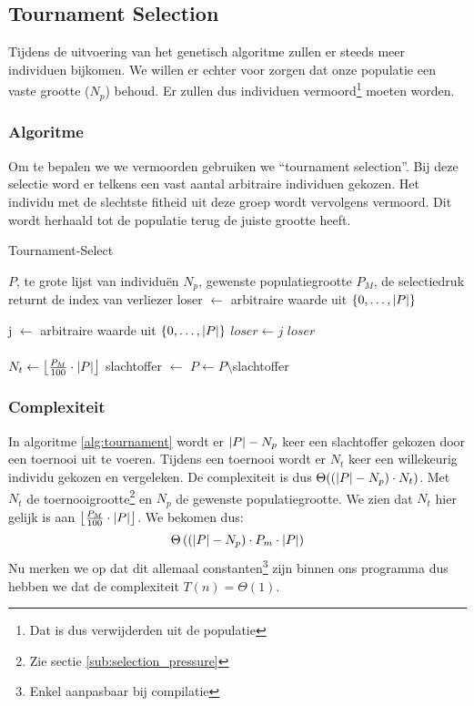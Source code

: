 %
\subsection{Tournament Selection}
\label{sub:tournament}
Tijdens de uitvoering van het genetisch algoritme zullen er steeds meer individuen bijkomen. We willen er echter voor zorgen dat onze populatie een vaste grootte ($N_p$) behoud. Er zullen dus individuen vermoord\footnote{Dat is dus verwijderden uit de populatie} moeten worden.
\subsubsection{Algoritme}
Om te bepalen we we vermoorden gebruiken we ``tournament selection''. Bij deze selectie word er telkens een vast aantal arbitraire individuen gekozen. Het individu met de slechtste fitheid uit deze groep wordt vervolgens vermoord. Dit wordt herhaald tot de populatie terug de juiste grootte heeft.
	\begin{algorithm}[H]
	 	\caption{Tournament-Select}
		\begin{algorithmic}
		\Require 
			\State $P$, te grote lijst van individuën 
			\State $N_p$, gewenste populatiegrootte
			\State $P_M$, de selectiedruk
		\Ensure returnt de index van verliezer
		\State loser $\gets$ arbitraire waarde uit $\lbrace 0, \dots, \lvert P \rvert \rbrace$

		\State j $\gets$ arbitraire waarde uit $\lbrace 0, \dots, \lvert P \rvert \rbrace$
			\State $loser \gets j$
		\EndIf
		\EndFor		
		\State \Return $loser$
		\EndFunction
		\\
		\\
			\State $N_t \gets \left\lfloor\frac{P_M}{100} \cdot \lvert P \rvert\right\rfloor$ 
			\State slachtoffer $\gets$ 
			\State $P \gets P\setminus$slachtoffer
		\EndWhile
		
		\end{algorithmic}
		\label{alg:tournament}
	\end{algorithm}		
\subsubsection{Complexiteit}
In algoritme \ref{alg:tournament} wordt er $\lvert P \rvert-N_p$ keer een slachtoffer gekozen door een toernooi uit te voeren. Tijdens een toernooi wordt er $N_t$ keer een willekeurig individu gekozen en vergeleken. De complexiteit is dus $\Theta((\lvert P \rvert-N_p)\cdot N_t)$. Met $N_t$ de toernooigrootte\footnote{Zie sectie \ref{sub:selection_pressure}} en $N_p$ de gewenste populatiegrootte. We zien dat $N_t$ hier gelijk is aan
 $\left\lfloor\frac{P_M}{100} \cdot \lvert P \rvert\right\rfloor$.
 We bekomen dus: \[\Theta\left(\left(\lvert P \rvert-N_p\right)\cdot P_m \cdot \lvert P \rvert\right)\]
 Nu merken we op dat dit allemaal constanten\footnote{Enkel aanpasbaar bij compilatie} zijn binnen ons programma dus hebben we dat de complexiteit $T(n) = \Theta(1)$. 

